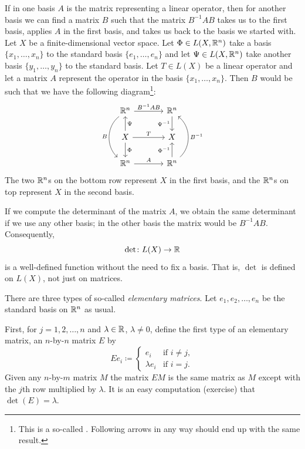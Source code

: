 If in one basis $A$ is the matrix representing a
linear operator, then for another basis we can find a matrix $B$ such
that the matrix $B^{-1}AB$ takes us to the first basis, applies $A$ in the
first basis, and takes us back to the basis we started with.
Let $X$ be a finite-dimensional vector space.
Let $\Phi \in L(X,{\mathbb{R}}^n)$ take a basis $\{ x_1,\ldots,x_n \}$ to the
standard basis $\{ e_1,\ldots,e_n \}$ and let $\Psi \in L(X,{\mathbb{R}}^n)$
take another basis $\{ y_1, \ldots, y_n \}$ to the standard basis.
Let $T \in L(X)$ be a linear operator and let a matrix $A$
represent the operator
in the basis $\{ x_1,\ldots,x_n \}$.
Then $B$ would be such that we have the following diagram\footnote{%
This is a so-called \emph{}.
Following arrows in any way should end up with the same result.}:
\begin{equation*}
\begin{tikzcd}[row sep=normal,column sep=large]
\R^n \ar[r, "B^{-1}AB"]  \ar[dd, bend right=50, "B"'] &
  \R^n \ar[d, "\Psi^{-1}"'] \\
X \ar[r, "T"] \ar[u, "\Psi"'] \ar[d, "\Phi"]        &
  X \\
\R^n \ar[r, "A"]                                      &
  \R^n \ar[u, "\Phi^{-1}"] \ar[uu, bend right=50, "B^{-1}"'] 
\end{tikzcd}
\end{equation*}
The two ${\mathbb{R}}^n$s on the bottom row represent
$X$ in the first basis, and the ${\mathbb{R}}^n$s on top represent $X$ in the
second
basis.

If we compute the determinant of the matrix $A$, we obtain
the same determinant if we use any other basis;
in the other basis the matrix would be $B^{-1}AB$.
Consequently,
\begin{equation*}
\det \colon L(X) \to \R
\avoidbreak
\end{equation*}
is a well-defined function without the need to fix a basis.
That is, $\det$ is defined on $L(X)$, not just on matrices.

\medskip

There are three types of so-called
\emph{elementary matrices}.
Let
$e_1,e_2,\ldots,e_n$ be the standard basis on ${\mathbb{R}}^n$ as usual.

First,
for $j =
1,2,\ldots,n$ and
$\lambda \in {\mathbb{R}}$, $\lambda \neq 0$, define
the first type of an elementary matrix,
an
$n$-by-$n$ matrix $E$ by
\begin{equation*}
Ee_i \coloneqq 
\begin{cases}
e_i & \text{if } i \neq j , \\
\lambda e_i & \text{if } i = j .
\end{cases}
\end{equation*}
Given any $n$-by-$m$ matrix $M$ the matrix $EM$ is the same matrix as $M$
except with the $j$th row multiplied by $\lambda$.
It is an easy computation (exercise) that $\det(E) = \lambda$.

